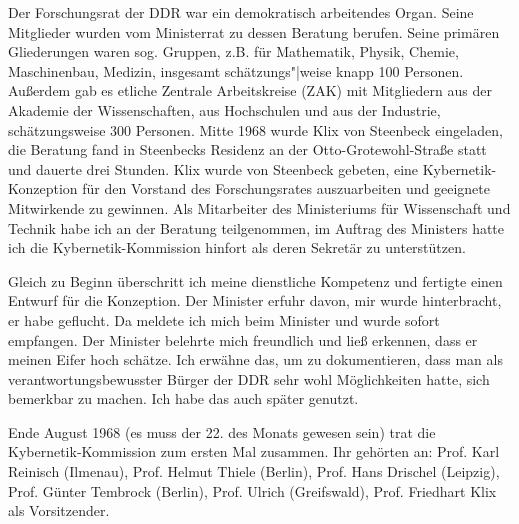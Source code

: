 \documentclass[11pt,a4paper]{article}
\begin{document}
Der Forschungsrat der DDR war ein demokratisch arbeitendes Organ. Seine
Mitglieder wurden vom Ministerrat zu dessen Beratung berufen. Seine primären
Gliederungen waren sog. Gruppen, z.B. für Mathematik, Physik, Chemie,
Maschinenbau, Medizin, insgesamt schätzungs"|weise knapp 100 Personen.
Außerdem gab es etliche Zentrale Arbeitskreise (ZAK) mit Mitgliedern aus der
Akademie der Wissenschaften, aus Hochschulen und aus der Industrie,
schätzungsweise 300 Personen. Mitte 1968 wurde Klix von Steenbeck eingeladen,
die Beratung fand in Steenbecks Residenz an der Otto-Grotewohl-Straße statt
und dauerte drei Stunden. Klix wurde von Steenbeck gebeten, eine
Kybernetik-Konzeption für den Vorstand des Forschungsrates auszuarbeiten und
geeignete Mitwirkende zu gewinnen. Als Mitarbeiter des Ministeriums für
Wissenschaft und Technik habe ich an der Beratung teilgenommen, im Auftrag des
Ministers hatte ich die Kybernetik-Kommission hinfort als deren Sekretär zu
unterstützen.

Gleich zu Beginn überschritt ich meine dienstliche Kompetenz und fertigte
einen Entwurf für die Konzeption. Der Minister erfuhr davon, mir wurde
hinterbracht, er habe geflucht. Da meldete ich mich beim Minister und wurde
sofort empfangen. Der Minister belehrte mich freundlich und ließ erkennen,
dass er meinen Eifer hoch schätze. Ich erwähne das, um zu dokumentieren, dass
man als verantwortungsbewusster Bürger der DDR sehr wohl Möglichkeiten hatte,
sich bemerkbar zu machen. Ich habe das auch später genutzt.

Ende August 1968 (es muss der 22. des Monats gewesen sein) trat die
Kybernetik-Kommission zum ersten Mal zusammen. Ihr gehörten an: Prof. Karl
Reinisch (Ilmenau), Prof. Helmut Thiele (Berlin), Prof. Hans Drischel
(Leipzig), Prof. Günter Tembrock (Berlin), Prof. Ulrich (Greifswald),
Prof. Friedhart Klix als Vorsitzender.
\vfill
\ccnotice
\end{document}
